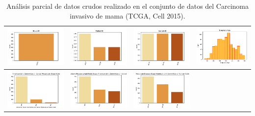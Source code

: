 \newpage
\begin{table}
	\begin{center} 
		\caption{Análisis parcial de datos crudos realizado en el conjunto de datos del Carcinoma invasivo de mama (TCGA, Cell 2015).}
		\label{datos_crudos}
		\begin{tabular}{ |c|c|c|c| }
			\hline 
			\includegraphics[width=.25\textwidth]{NOTEBOOK/IMAGENES_CRUDAS/1} 
			& \includegraphics[width=.25\textwidth]{NOTEBOOK/IMAGENES_CRUDAS/2} 
			& \includegraphics[width=.25\textwidth]{NOTEBOOK/IMAGENES_CRUDAS/3}
			& \includegraphics[width=.25\textwidth]{NOTEBOOK/IMAGENES_CRUDAS/4} 
			\\  \hline 
			\includegraphics[width=.25\textwidth]{NOTEBOOK/IMAGENES_CRUDAS/5} 
			& \includegraphics[width=.25\textwidth]{NOTEBOOK/IMAGENES_CRUDAS/6} 
			& \includegraphics[width=.25\textwidth]{NOTEBOOK/IMAGENES_CRUDAS/7} 

\end{tabular}
\end{center}
\end{table}
